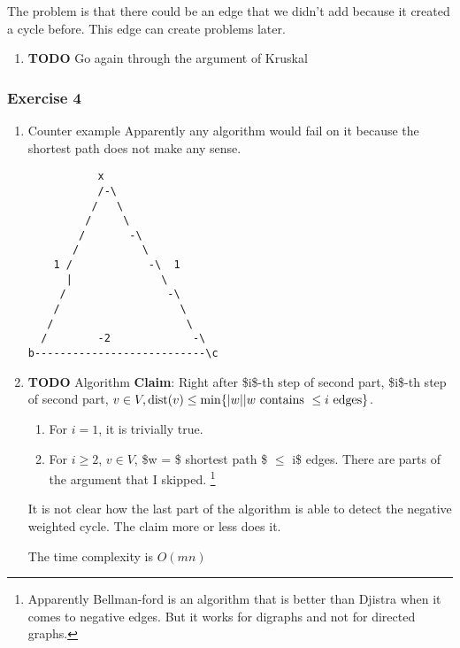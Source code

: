 \documentclass[11pt]{article}
\def\min{\operatorname{min}}
\def\dist{\operatorname{dist}}
\begin{document}
The problem is that there could be an edge that we didn't add because it
created a cycle before. This edge can create problems later.
\begin{enumerate}
\item {\bfseries\sffamily TODO} Go again through the argument of Kruskal
\label{sec:org150484a}
\end{enumerate}
\subsubsection{Exercise 4}
\label{sec:org02c63b4}
\begin{enumerate}
\item Counter example
\label{sec:org74b9a05}
Apparently any algorithm would fail on it because the shortest path does
not make any sense.
\begin{verbatim}
           x
           /-\
          /   \
         /     \
        /       -\
       /          \
    1 /            -\  1       
      |              \        
     /                -\      
    /                   \     
   /                     \    
  /        -2             -\  
b---------------------------\c
\end{verbatim}
\item {\bfseries\sffamily TODO} Algorithm
\label{sec:org05980b1}
\textbf{Claim}: Right after \$i\$-th step of second part, \$i\$-th step of second
 part, \(v \in V, \dist(v) \le \min \{ \vert w\vert \vert w \textup{
      contains } \le i \textup{ edges} \}\).

\begin{enumerate}
\item For \(i=1\), it is trivially true.
\item For \(i\ge 2\), \(v \in V\), \$w = \$ shortest path \$ \(\le\) i\$ edges. There are
parts of the argument that I skipped. \footnote{Apparently Bellman-ford is an algorithm that is better than Djistra when
it comes to negative edges. But it works for digraphs and not for directed
graphs.}
\end{enumerate}

It is not clear how the last part of the algorithm is able to detect the
negative weighted cycle. The claim more or less does it.

The time complexity is \(O(mn)\)
\end{enumerate}
\end{document}
